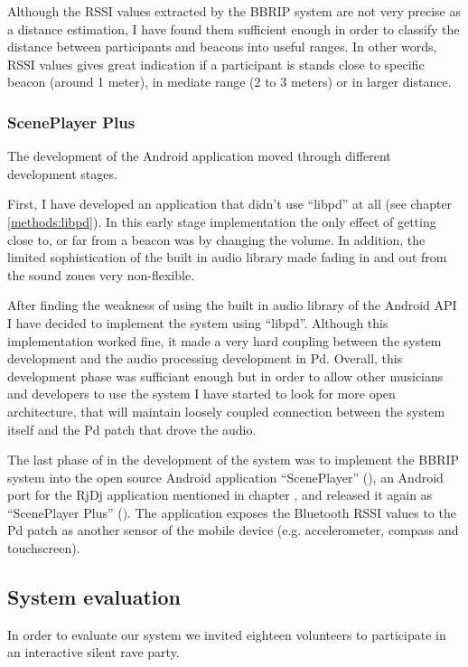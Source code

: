 Although the RSSI values extracted by the BBRIP system are not very precise as a distance estimation, I have found them sufficient enough in order to classify the distance between participants and beacons into useful ranges. In other words, RSSI values gives great indication if a participant is stands close to specific beacon (around 1 meter), in mediate range (2 to 3 meters) or in larger distance.

\subsubsection{ScenePlayer Plus}

The development of the Android application moved through different development stages.

First, I have developed an application that didn't use ``libpd'' at all (see chapter \ref{methods:libpd}). In this early stage implementation the only effect of getting close to, or far from a beacon was by changing the volume. In addition, the limited sophistication of the built in audio library made fading in and out from the sound zones very non-flexible.

After finding the weakness of using the built in audio library of the Android API I have decided to implement the system using ``libpd''. Although this implementation worked fine, it made a very hard coupling between the system development and the audio processing development in Pd. Overall, this development phase was sufficiant enough but in order to allow other musicians and developers to use the system I have started to look for more open architecture, that will maintain loosely coupled connection between the system itself and the Pd patch that drove the audio.

The last phase of in the development of the system was to implement the BBRIP system into the open source Android application ``ScenePlayer'' (\cite{web:sceneplayer}), an Android port for the RjDj application mentioned in chapter , and released it again as ``ScenePlayer Plus'' (\cite{web:sceneplayerplus}). The application exposes the Bluetooth RSSI values to the Pd patch as another sensor of the mobile device (e.g. accelerometer, compass and touchscreen).

\subsection{System evaluation}

In order to evaluate our system we invited eighteen volunteers to participate in an interactive silent rave party.

